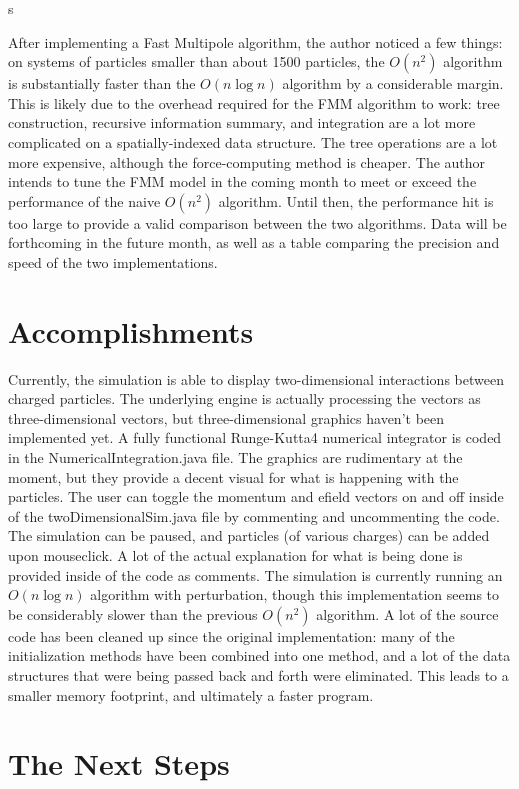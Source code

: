 s\documentclass[10pt]{article}
\begin{document}
After implementing a Fast Multipole algorithm, the author noticed a few things: on systems of particles smaller than about 1500 particles, the $O(n^2)$ algorithm is substantially faster than the $O(n \log n)$ algorithm by a considerable margin. This is likely due to the overhead required for the FMM algorithm to work: tree construction, recursive information summary, and integration are a lot more complicated on a spatially-indexed data structure. The tree operations are a lot more expensive, although the force-computing method is cheaper. The author intends to tune the FMM model in the coming month to meet or exceed the performance of the naive $O(n^2)$ algorithm. Until then, the performance hit is too large to provide a valid comparison between the two algorithms. Data will be forthcoming in the future month, as well as a table comparing the precision and speed of the two implementations.

\clearpage
\section{Accomplishments}
Currently, the simulation is able to display two-dimensional interactions between charged particles. The underlying engine is actually processing the vectors as three-dimensional vectors, but three-dimensional graphics haven't been implemented yet. A fully functional Runge-Kutta4 numerical integrator is coded in the NumericalIntegration.java file. The graphics are rudimentary at the moment, but they provide a decent visual for what is happening with the particles. The user can toggle the momentum and efield vectors on and off inside of the twoDimensionalSim.java file by commenting and uncommenting the code. The simulation can be paused, and particles (of various charges) can be added upon mouseclick. A lot of the actual explanation for what is being done is provided inside of the code as comments. The simulation is currently running an $O(n \log n)$ algorithm with perturbation, though this implementation seems to be considerably slower than the previous $O(n^2)$ algorithm. A lot of the source code has been cleaned up since the original implementation: many of the initialization methods have been combined into one method, and a lot of the data structures that were being passed back and forth were eliminated. This leads to a smaller memory footprint, and ultimately a faster program.

\section{The Next Steps}
\end{document}
